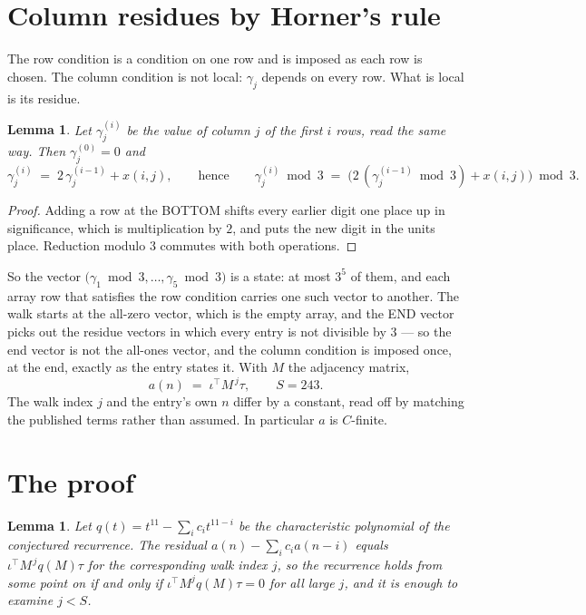 \documentclass[11pt,a4paper]{article}
\theoremstyle{plain}
\newtheorem{lemma}[theorem]{Lemma}
\theoremstyle{definition}
\begin{document}
\section{Column residues by Horner's rule}

The row condition is a condition on one row and is imposed as each row is chosen. The column
condition is not local: $\gamma_j$ depends on every row. What is local is its residue.

\begin{lemma}\label{lem:horner}
Let $\gamma_j^{(i)}$ be the value of column $j$ of the first $i$ rows, read the same way.
Then $\gamma_j^{(0)}=0$ and
\[
\gamma_j^{(i)}\;=\;2\,\gamma_j^{(i-1)}+x(i,j),
\qquad\text{hence}\qquad
\gamma_j^{(i)}\bmod 3\;=\;
\bigl(2\,(\gamma_j^{(i-1)}\bmod 3)+x(i,j)\bigr)\bmod 3 .
\]
\end{lemma}

\begin{proof}
Adding a row at the BOTTOM shifts every earlier digit one place up in significance, which is
multiplication by $2$, and puts the new digit in the units place. Reduction modulo
$3$ commutes with both operations.
\end{proof}

So the vector $\bigl(\gamma_1\bmod 3,\dots,\gamma_{5}\bmod
3\bigr)$ is a state: at most $3^{5}$ of them, and each array row
that satisfies the row condition carries one such vector to another. The walk starts at the
all-zero vector, which is the empty array, and the END vector picks out the residue vectors in
which every entry is not divisible by $3$ --- so the end vector is not the all-ones
vector, and the column condition is imposed once, at the end, exactly as the entry states it.
With $M$ the adjacency matrix,
\[
a(n)\;=\;\iota^{\!\top}M^{\,j}\tau ,\qquad S=243.
\]
The walk index $j$ and the entry's own $n$ differ by a constant, read off by matching the
published terms rather than assumed. In particular $a$ is $C$-finite.

\section{The proof}

\begin{lemma}\label{lem:crit}
Let $q(t)=t^{11}-\sum_i c_it^{11-i}$ be the characteristic polynomial of the
conjectured recurrence. The residual $a(n)-\sum_ic_ia(n-i)$ equals
$\iota^{\!\top}M^{\,j}q(M)\tau$ for the corresponding walk index $j$, so the recurrence
holds from some point on if and only if $\iota^{\!\top}M^{j}q(M)\tau=0$ for all large $j$,
and it is enough to examine $j<S$.
\end{lemma}
\end{document}
